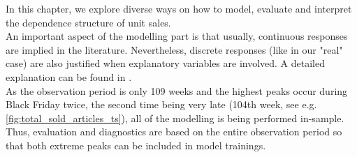 
In this chapter, we explore diverse ways on how to model, evaluate and interpret the dependence structure of unit sales. 
\\





An important aspect of the modelling part is that usually, continuous responses are implied in the literature. Nevertheless, discrete responses (like in our "real" case) are also justified when explanatory variables are involved. A detailed explanation can be found in \cite{trivedi2017note}.\\ 
As the observation period is only 109 weeks and the highest peaks occur during Black Friday twice, the second time being very late (104th week, see e.g. \autoref{fig:total_sold_articles_ts}), all of the modelling is being performed in-sample. Thus, evaluation and diagnostics are based on the entire observation period so that both extreme peaks can be included in model trainings.


